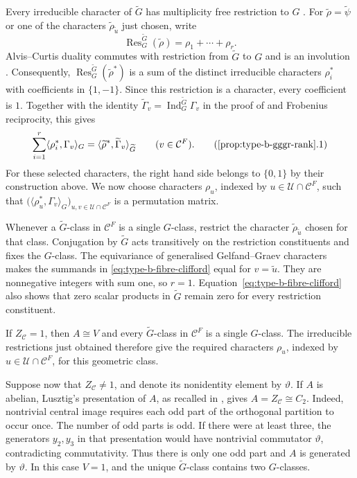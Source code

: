 \documentclass[10pt]{amsart}
\theoremstyle{definition}
\let\oldendproof\endproof
\renewenvironment{proof}[1][\proofname]{%
  \oldproof[\bfseries #1]%
}{\oldendproof}
\numberwithin{equation}{section}
\numberwithin{table}{section}
\begin{document}
\begin{proof}
Every irreducible character of $\widetilde G$ has multiplicity free
restriction to $G$ \cite[Theorem~1.7.15]{GeckMalle2020}.
For $\widetilde\rho=\widetilde\psi$ or one of the characters
$\widetilde\rho_{\widetilde u}$ just chosen, write
\[
 \operatorname{Res}^{\widetilde G}_G(\widetilde\rho)
 =\rho_1+\cdots+\rho_r.
\]
Alvis--Curtis duality commutes with restriction from $\widetilde G$ to
$G$ and is an involution
\cite[Proposition~3.4.3 and Corollary~3.4.5]{GeckMalle2020}.
Consequently, $\operatorname{Res}^{\widetilde G}_G(\widetilde\rho^*)$
is a sum of the distinct irreducible characters $\rho_i^*$ with
coefficients in $\{1,-1\}$. Since this restriction is a character,
every coefficient is $1$. Together with the identity
$\widetilde\Gamma_v=\operatorname{Ind}_G^{\widetilde G}\Gamma_v$
in the proof of \cite[Lemma~14.12]{Taylor2016} and Frobenius
reciprocity, this gives
\[
 \sum_{i=1}^r\langle\rho_i^*,\Gamma_v\rangle_G
 =\langle\widetilde\rho^*,\widetilde\Gamma_v\rangle_{\widetilde G}
 \qquad(v\in\mathcal C^F).
 \tag{\ref{prop:type-b-gggr-rank}.1}
 \label{eq:type-b-fibre-clifford}
\]
For these selected characters, the right hand side belongs to
$\{0,1\}$ by their construction above. We now choose characters $\rho_u$,
indexed by $u\in\mathcal U\cap\mathcal C^F$, such that
$\bigl(\langle\rho_u^*,\Gamma_v\rangle_G\bigr)_{u,v\in\mathcal U\cap\mathcal C^F}$
is a permutation matrix.

Whenever a $\widetilde G$-class in $\mathcal C^F$ is a single
$G$-class, restrict the character $\widetilde\rho_{\widetilde u}$
chosen for that class. Conjugation by $\widetilde G$ acts transitively
on the restriction constituents and fixes the $G$-class.
The equivariance of generalised Gelfand--Graev characters
\cite[Proposition~2.2]{Geck1993} makes the summands in
\eqref{eq:type-b-fibre-clifford} equal for $v=\widetilde u$.
They are nonnegative integers with sum one, so $r=1$.
Equation~\eqref{eq:type-b-fibre-clifford} also shows that zero scalar
products in $\widetilde G$ remain zero for every restriction constituent.

If $Z_{\mathcal C}=1$, then $A\cong V$ and every
$\widetilde G$-class in $\mathcal C^F$ is a single $G$-class.
The irreducible restrictions just obtained therefore give the required
characters $\rho_u$, indexed by $u\in\mathcal U\cap\mathcal C^F$,
for this geometric class.

Suppose now that $Z_{\mathcal C}\ne1$, and denote its nonidentity
element by $\vartheta$. If $A$ is abelian, Lusztig's presentation of
$A$, as recalled in \cite[pp.~45--46]{Taylor2013}, gives
$A=Z_{\mathcal C}\cong C_2$. Indeed, nontrivial central image requires
each odd part of the orthogonal partition to occur once. The number
of odd parts is odd. If there were at least three, the generators
$y_2,y_3$ in that presentation would have nontrivial commutator
$\vartheta$, contradicting commutativity. Thus there is only one odd
part and $A$ is generated by $\vartheta$. In this case $V=1$, and the
unique $\widetilde G$-class contains two $G$-classes.


\end{proof}
\end{document}
